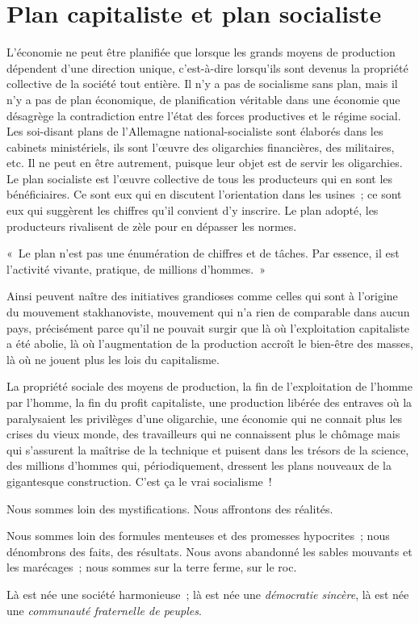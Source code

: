 \documentclass[french,twoside]{book} %
\newcommand{\bibl}[1]{{\RaggedLeft{#1}\par\bigskip}}
\newenvironment{quoteblock}%
  {\begin{quoting}}
  {\end{quoting}}
\newenvironment{quotebar}{%
    \def\FrameCommand{{\color{rubric!10!}\vrule width 0.5em} \hspace{0.9em}}%
    \def\OuterFrameSep{\itemsep} %
    \MakeFramed {\advance\hsize-\width \FrameRestore}
  }%
  {%
    \endMakeFramed
  }
\renewenvironment{quoteblock}%
  {%
    \savenotes
    \setstretch{0.9}
    \normalfont
    \begin{quotebar}
  }
  {%
    \end{quotebar}
    \spewnotes
  }
\begin{document}
\section[{Plan capitaliste et plan socialiste}]{Plan capitaliste et plan socialiste}
\noindent L’économie ne peut être planifiée que lorsque les grands moyens de production dépendent d’une direction unique, c’est-à-dire lorsqu’ils sont devenus la propriété collective de la société tout entière. Il n’y a pas de socialisme sans plan, mais il n’y a pas de plan économique, de planification véritable dans une économie que désagrège la contradiction entre l’état des forces productives et le régime social. Les soi-disant plans de l’Allemagne national-socialiste sont élaborés dans les cabinets ministériels, ils sont l’œuvre des oligarchies financières, des militaires, etc. Il ne peut en être autrement, puisque leur objet est de servir les oligarchies. Le plan socialiste est l’œuvre collective de tous les producteurs qui en sont les bénéficiaires. Ce sont eux qui en discutent l’orientation dans les usines ; ce sont eux qui suggèrent les chiffres qu’il convient d’y inscrire. Le plan adopté, les producteurs rivalisent de zèle pour en dépasser les normes.\par

\begin{quoteblock}
 \noindent « Le plan n’est pas une énumération de chiffres et de tâches. Par essence, il est l’activité vivante, pratique, de millions d’hommes. »\par
 
\bibl{(Staline)}
 \end{quoteblock}

\noindent Ainsi peuvent naître des initiatives grandioses comme celles qui sont à l’origine du mouvement stakhanoviste, mouvement qui n’a rien de comparable dans aucun pays, précisément parce qu’il ne pouvait surgir que là où l’exploitation capitaliste a été abolie, là où l’augmentation de la production accroît le bien-être des masses, là où ne jouent plus les lois du capitalisme.\par
La propriété sociale des moyens de production, la fin de l’exploitation de l’homme par l’homme, la fin du profit capitaliste, une production libérée des entraves où la paralysaient les privilèges d’une oligarchie, une économie qui ne connait plus les crises du vieux monde, des travailleurs qui ne connaissent plus le chômage mais qui s’assurent la maîtrise de la technique et puisent dans les trésors de la science, des millions d’hommes qui, périodiquement, dressent les plans nouveaux de la gigantesque construction. C’est ça le vrai socialisme !\par
Nous sommes loin des mystifications. Nous affrontons des réalités.\par
Nous sommes loin des formules menteuses et des promesses hypocrites ; nous dénombrons des faits, des résultats. Nous avons abandonné les sables mouvants et les marécages ; nous sommes sur la terre ferme, sur le roc.\par
Là est née une société harmonieuse ; là est née une \emph{démocratie sincère}, là est née une \emph{communauté fraternelle de peuples}.
\end{document}

